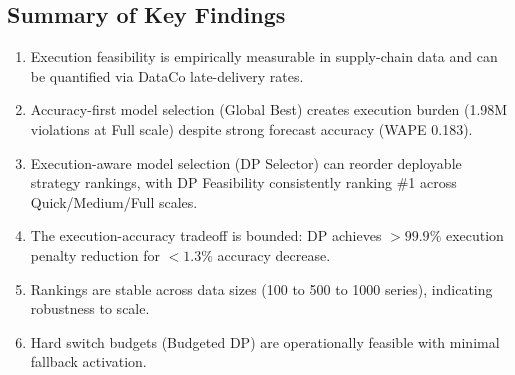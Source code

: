 \subsection{Summary of Key Findings}

\begin{enumerate}
    \item Execution feasibility is empirically measurable in supply-chain data and can be quantified via DataCo late-delivery rates.

    \item Accuracy-first model selection (Global Best) creates execution burden (1.98M violations at Full scale) despite strong forecast accuracy (WAPE 0.183).

    \item Execution-aware model selection (DP Selector) can reorder deployable strategy rankings, with DP Feasibility consistently ranking \#1 across Quick/Medium/Full scales.

    \item The execution-accuracy tradeoff is bounded: DP achieves $>99.9\%$ execution penalty reduction for $<1.3\%$ accuracy decrease.

    \item Rankings are stable across data sizes (100 to 500 to 1000 series), indicating robustness to scale.

    \item Hard switch budgets (Budgeted DP) are operationally feasible with minimal fallback activation.
\end{enumerate}
